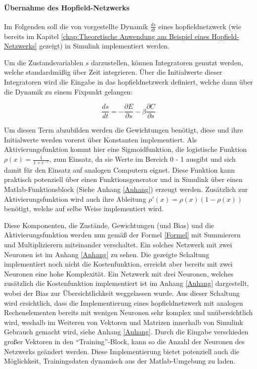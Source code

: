 \paragraph{Übernahme des Hopfield-Netzwerks}

Im Folgenden soll die von \citeauthor{Scellier2017} vorgestellte Dynamik \(\frac{ds}{dt}\) eines \gls{hopfieldnetzwerk} (wie bereits im Kapitel \ref{chap:Theoretische Anwendung am Beispiel eines Hopfield-Netzwerks} gezeigt) in Simulink implementiert werden.

Um die Zustandsvariablen \(s\) darzustellen, können Integratoren genutzt werden, welche standardmäßig über Zeit integrieren. Über die Initialwerte dieser Integratoren wird die Eingabe in das \gls{hopfieldnetzwerk} definiert, welche dann über die Dynamik zu einem Fixpunkt gelangen:

\[\frac{ds}{dt}=-\frac{\partial{E}}{\partial{s}}-\beta\frac{\partial{C}}{\partial{s}}\]

Um diesen Term abzubilden werden die Gewichtungen benötigt, diese und ihre Initialwerte werden vorerst über Konstanten implementiert. Als Aktivierungsfunktion kommt hier eine Sigmoidfunktion, die logistische Funktion \(\rho(x)=\frac{1}{1+e^{-x}}\), zum Einsatz, da sie Werte im Bereich 0 - 1 ausgibt und sich damit für den Einsatz auf analogen Computern eignet. Diese Funktion kann praktisch potenziell über einen Funktionsgenerator und in Simulink über einen Matlab-Funktionsblock (Siehe Anhang \ref{Anhang}) erzeugt werden. Zusätzlich zur Aktivierungsfunktion wird auch ihre Ableitung \(\rho'(x)=\rho(x)(1-\rho(x))\) benötigt, welche auf selbe Weise implementiert wird.

Diese Komponenten, die Zustände, Gewichtungen (und Bias) und die Aktivierungsfunktion werden nun gemäß der Formel \ref{Formel} mit Summierern und Multiplizierern miteinander verschaltet. Ein solches Netzwerk mit zwei Neuronen ist im Anhang \ref{Anhang} zu sehen. Die gezeigte Schaltung implementiert noch nicht die Kostenfunktion, erreicht aber bereits mit zwei Neuronen eine hohe Komplexität. Ein Netzwerk mit drei Neuronen, welches zusätzlich die Kostenfunktion implementiert ist im Anhang \ref{Anhang} dargestellt, wobei der Bias zur Übersichtlichkeit weggelassen wurde. Aus dieser Schaltung wird ersichtlich, dass die Implementierung eines \gls{hopfieldnetzwerk} mit analogen Rechenelementen bereits mit wenigen Neuronen sehr komplex und unübersichtlich wird, weshalb im Weiteren von Vektoren und Matrizen innerhalb von Simulink Gebrauch gemacht wird, siehe Anhang \ref{Anhang}. Durch die Eingabe verschieden großer Vektoren in den "`Training"'-Block, kann so die Anzahl der Neuronen des Netzwerks geändert werden. Diese Implementierung bietet potenziell auch die Möglichkeit, Trainingsdaten dynamisch aus der Matlab-Umgebung zu laden.
